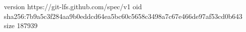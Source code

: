 version https://git-lfs.github.com/spec/v1
oid sha256:7b9a5c3f284aa9b0eddcd64ea5bc60c5658c3498a7c67e466de97af53cd0b643
size 187939
